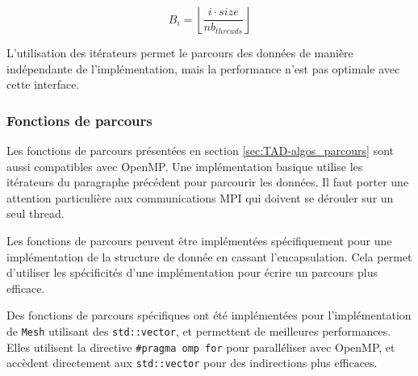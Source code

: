 \begin{equation}
    B_i = \left \lfloor{\frac{i \cdot size}{nb_{threads}}}\right \rfloor 
\end{equation}

L'utilisation des itérateurs permet le parcours des données de manière indépendante de l'implémentation, mais la performance n'est pas optimale avec cette interface.

\subsubsection{Fonctions de parcours}

Les fonctions de parcours présentées en section \ref{sec:TAD-algos_parcours} sont aussi compatibles avec OpenMP. Une implémentation basique utilise les itérateurs du paragraphe précédent pour parcourir les données. Il faut porter une attention particulière aux communications MPI qui doivent se dérouler sur un seul thread.

Les fonctions de parcours peuvent être implémentées spécifiquement pour une implémentation de la structure de donnée en cassant l'encapsulation. Cela permet d'utiliser les spécificités d'une implémentation pour écrire un parcours plus efficace.

Des fonctions de parcours spécifiques ont été implémentées pour l'implémentation de \verb|Mesh| utilisant des \verb|std::vector|, et permettent de meilleures performances. Elles utilisent la directive \verb|#pragma omp for| pour paralléliser avec OpenMP, et accèdent directement aux \verb|std::vector| pour des indirections plus efficaces.
